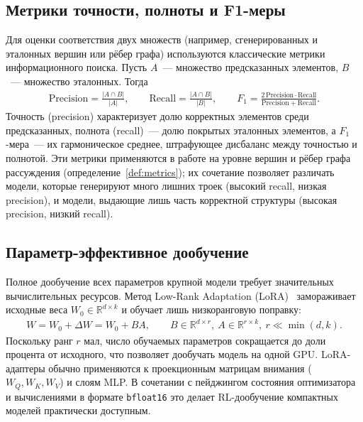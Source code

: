 \subsection{Метрики точности, полноты и F1-меры}
\label{subsec:theory-metrics}

Для оценки соответствия двух множеств (например, сгенерированных и эталонных вершин или рёбер графа) используются классические метрики информационного поиска. Пусть $A$~--- множество предсказанных элементов, $B$~--- множество эталонных. Тогда
\begin{align}
    \mathrm{Precision} = \frac{|A \cap B|}{|A|}, \qquad
    \mathrm{Recall} = \frac{|A \cap B|}{|B|}, \qquad
    F_1 = \frac{2\,\mathrm{Precision}\cdot\mathrm{Recall}}{\mathrm{Precision} + \mathrm{Recall}}.
    \label{eq:prf}
\end{align}
Точность (precision) характеризует долю корректных элементов среди предсказанных, полнота (recall)~--- долю покрытых эталонных элементов, а $F_1$-мера~--- их гармоническое среднее, штрафующее дисбаланс между точностью и полнотой. Эти метрики применяются в работе на уровне вершин и рёбер графа рассуждения (определение~\ref{def:metrics}); их сочетание позволяет различать модели, которые генерируют много лишних троек (высокий recall, низкая precision), и модели, выдающие лишь часть корректной структуры (высокая precision, низкий recall).

\subsection{Параметр-эффективное дообучение}
\label{subsec:theory-lora}

Полное дообучение всех параметров крупной модели требует значительных вычислительных ресурсов. Метод Low-Rank Adaptation (LoRA)~\cite{hu2022lora} замораживает исходные веса $W_0 \in \mathbb{R}^{d \times k}$ и обучает лишь низкоранговую поправку:
\begin{align}
    W = W_0 + \Delta W = W_0 + BA, \qquad B \in \mathbb{R}^{d \times r},\ A \in \mathbb{R}^{r \times k},\ r \ll \min(d, k).
    \label{eq:lora}
\end{align}
Поскольку ранг $r$ мал, число обучаемых параметров сокращается до доли процента от исходного, что позволяет дообучать модель на одной GPU. LoRA-адаптеры обычно применяются к проекционным матрицам внимания ($W_Q, W_K, W_V$) и слоям MLP. В сочетании с пейджингом состояния оптимизатора и вычислениями в формате \texttt{bfloat16} это делает RL-дообучение компактных моделей практически доступным.
